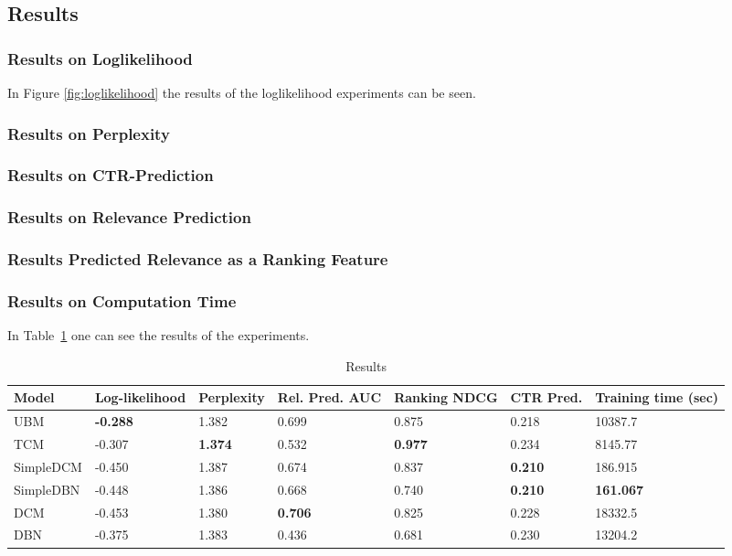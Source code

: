 \subsection{Results}

\subsubsection{Results on Loglikelihood}
In Figure \ref{fig:loglikelihood} the results of the loglikelihood experiments can be seen.

\subsubsection{Results on Perplexity}

\subsubsection{Results on CTR-Prediction}

\subsubsection{Results on Relevance Prediction}

\subsubsection{Results Predicted Relevance as a Ranking Feature}

\subsubsection{Results on Computation Time}

In Table~\ref{table:results} one can see the results of the experiments.

\begin{table}[h]
	\begin{tabular}{@{}lllllll@{}}
		\toprule
		Model     & Log-likelihood  & Perplexity	 & Rel. Pred. AUC		 & Ranking NDCG      & CTR Pred.		 & Training time (sec) \\ \midrule
		UBM       & \textbf{-0.288} & 1.382          & 0.699                 & 0.875			 & 0.218			 & 10387.7                 \\
		TCM       & -0.307          & \textbf{1.374} & 0.532                 & \textbf{0.977}	 & 0.234			 & 8145.77                 \\
		SimpleDCM & -0.450          & 1.387          & 0.674                 & 0.837             & \textbf{0.210}	 & 186.915                 \\
		SimpleDBN & -0.448          & 1.386          & 0.668                 & 0.740             & \textbf{0.210}	 & \textbf{161.067}        \\
		DCM       & -0.453          & 1.380          & \textbf{0.706}        & 0.825			 & 0.228			 & 18332.5                 \\
		DBN       & -0.375          & 1.383          & 0.436                 & 0.681			 & 0.230			 & 13204.2                 \\ \bottomrule
	\end{tabular}
	\caption{Results}
	\label{table:results}
\end{table}
